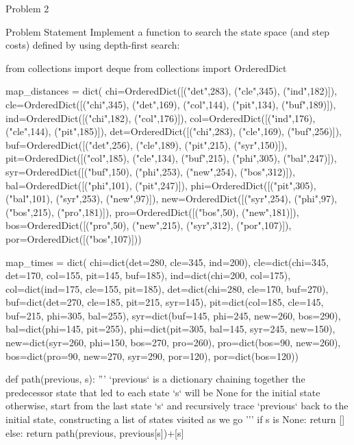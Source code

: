 \begin{problem}{Problem 2}
    \begin{statement}{Problem Statement}
        Implement a function  to search the state space (and step costs) defined by  using depth-first search:
    \end{statement}

    \begin{highlight}[Solution]
    \begin{code}[Python]
    from collections import deque
    from collections import OrderedDict
    
    map_distances = dict(
        chi=OrderedDict([("det",283), ("cle",345), ("ind",182)]),
        cle=OrderedDict([("chi",345), ("det",169), ("col",144), ("pit",134), ("buf",189)]),
        ind=OrderedDict([("chi",182), ("col",176)]),
        col=OrderedDict([("ind",176), ("cle",144), ("pit",185)]),
        det=OrderedDict([("chi",283), ("cle",169), ("buf",256)]),
        buf=OrderedDict([("det",256), ("cle",189), ("pit",215), ("syr",150)]),
        pit=OrderedDict([("col",185), ("cle",134), ("buf",215), ("phi",305), ("bal",247)]),
        syr=OrderedDict([("buf",150), ("phi",253), ("new",254), ("bos",312)]),
        bal=OrderedDict([("phi",101), ("pit",247)]),
        phi=OrderedDict([("pit",305), ("bal",101), ("syr",253), ("new",97)]),
        new=OrderedDict([("syr",254), ("phi",97), ("bos",215), ("pro",181)]),
        pro=OrderedDict([("bos",50), ("new",181)]),
        bos=OrderedDict([("pro",50), ("new",215), ("syr",312), ("por",107)]),
        por=OrderedDict([("bos",107)]))
    
    
    map_times = dict(
        chi=dict(det=280, cle=345, ind=200),
        cle=dict(chi=345, det=170, col=155, pit=145, buf=185),
        ind=dict(chi=200, col=175),
        col=dict(ind=175, cle=155, pit=185),
        det=dict(chi=280, cle=170, buf=270),
        buf=dict(det=270, cle=185, pit=215, syr=145),
        pit=dict(col=185, cle=145, buf=215, phi=305, bal=255),
        syr=dict(buf=145, phi=245, new=260, bos=290),
        bal=dict(phi=145, pit=255),
        phi=dict(pit=305, bal=145, syr=245, new=150),
        new=dict(syr=260, phi=150, bos=270, pro=260),
        pro=dict(bos=90, new=260),
        bos=dict(pro=90, new=270, syr=290, por=120),
        por=dict(bos=120))
    
    def path(previous, s): 
        '''
        `previous` is a dictionary chaining together the predecessor state that led to each state
        `s` will be None for the initial state
        otherwise, start from the last state `s` and recursively trace `previous` back to the initial state,
        constructing a list of states visited as we go
        '''
        if s is None:
            return []
        else:
            return path(previous, previous[s])+[s]
    

\end{code}
\end{highlight}
\end{problem}
